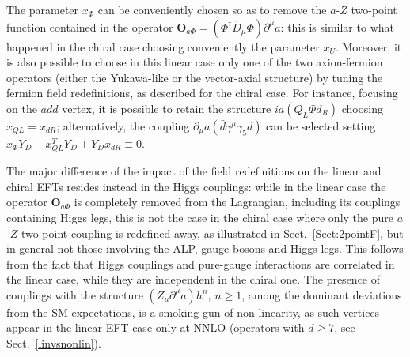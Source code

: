 \documentclass[11pt]{article}
\newcommand{\g}{\gamma}
\renewcommand{\O}{\mathbf{O}}
\newcommand{\de}{\partial}
\renewcommand{\[}{\begin{equation}}
\renewcommand{\]}{\end{equation}}
\begin{document}
\begin{appendices}
The parameter $x_\Phi$ can be conveniently chosen so as to remove the $a$-$Z$ two-point function contained in the operator $\O_{a\Phi}=(\Phi^\dag\overleftrightarrow{D}_\mu\Phi)\de^\mu a$: this is similar to what happened in the chiral case choosing conveniently the parameter $x_U$. Moreover, it is also possible to choose in this linear case  only one of the two axion-fermion operators (either the Yukawa-like or the vector-axial structure) by tuning the fermion field redefinitions, as described for the chiral case. For instance, focusing on the $a\bar{d}d$ vertex, it is possible to retain the structure $ia(\bar{Q}_L\Phi d_R)$ choosing $x_{QL}=x_{dR}$; alternatively,  the coupling $\de_\mu a(\bar{d}\g^\mu\g_5 d)$ can be selected  setting $x_\Phi Y_D-x_{QL}^TY_D+Y_Dx_{dR}\equiv0$. 

The major difference of the impact of the field redefinitions  on the linear and chiral EFTs resides instead in the Higgs couplings: while in the linear case the operator $\O_{a\Phi}$ is completely removed from the Lagrangian, including its couplings containing Higgs legs, this is not the case in the chiral case where only the pure $a$-$Z$ two-point coupling is redefined away, as illustrated in Sect.~\ref{Sect:2pointF}, but in general not those involving the ALP, gauge bosons and Higgs legs. This follows from the fact that Higgs couplings and pure-gauge interactions are correlated in the linear case, while they are independent in the chiral one. The presence of couplings with the structure $(Z_\mu \de^\mu a) h^n,\, n\geq 1$, among the dominant deviations from the SM expectations, is a \underline{smoking gun of non-linearity}, as such vertices appear in the linear EFT case only at NNLO (operators with $d\ge 7$, see Sect.~\ref{linvsnonlin}).




\end{appendices}


%
%
\end{document}
